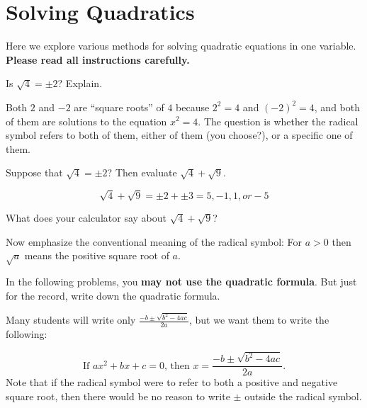 \newpage
\section{Solving Quadratics}\label{A:solvingQuadratics}
Here we explore various methods for solving quadratic equations in one variable.  \textbf{Please read all instructions carefully.}

\begin{prob}
Is $\sqrt{4}=\pm 2$?  Explain. 
\end{prob}

\vfill

\begin{teachingnote}
Both $2$ and $-2$ are ``square roots'' of $4$ because $2^2=4$ and $(-2)^2=4$, and both of them are solutions to the equation $x^2=4$.  The question is whether the radical symbol refers to both of them, either of them (you choose?), or a specific one of them.  
\end{teachingnote}

\begin{prob}
Suppose that $\sqrt{4}=\pm 2$?  Then evaluate $\sqrt{4}+\sqrt{9}$.  
\end{prob}

\begin{teachingnote}
$$\sqrt{4}+\sqrt{9}=\pm2+\pm3=5, -1, 1, or -5$$
\end{teachingnote}

\vfill

\begin{prob}
What does your calculator say about $\sqrt{4}+\sqrt{9}$?  
\end{prob}

\vfill 

\begin{teachingnote}
Now emphasize the conventional meaning of the radical symbol:  For $a>0$ then $\sqrt{a}$ means the positive square root of $a$.  
\end{teachingnote}



\begin{prob}
In the following problems, you \textbf{may not use the quadratic formula}.  But just for the record, write down the quadratic formula.  
\end{prob}
\begin{teachingnote}
Many students will write only $\frac{-b\pm\sqrt{b^2-4ac}}{2a}$, but we want them to write the following:  

$$\text{If }ax^2+bx+c=0\text{, then }x=\frac{-b\pm\sqrt{b^2-4ac}}{2a}\text{.}$$
Note that if the radical symbol were to refer to both a positive and negative square root, then there would be no reason to write $\pm$ outside the radical symbol.  
\end{teachingnote}

